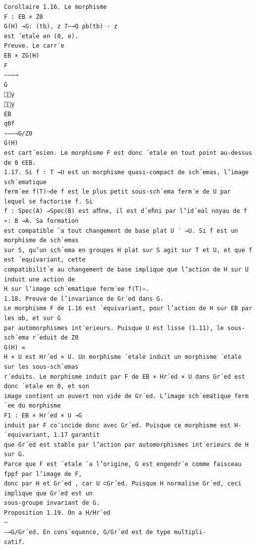 \documentclass[10pt]{article}
\begin{document}
\begin{verbatim}
Corollaire 1.16. Le morphisme
F : EB × Z0
G(H) →G: (tb), z 7−→Q ρb(tb) · z
est ´etale en (0, e).
Preuve. Le carr´e
EB × ZG(H)
F
−−−→
G
y
y
EB
q0f
−−−→G/Z0
G(H)
est cart´esien. Le morphisme F est donc ´etale en tout point au-dessus de 0 ∈EB.
1.17. Si f : T →U est un morphisme quasi-compact de sch´emas, l’image sch´ematique
ferm´ee f(T)−de f est le plus petit sous-sch´ema ferm´e de U par lequel se factorise f. Si
f : Spec(A) →Spec(B) est aﬃne, il est d´eﬁni par l’id´eal noyau de f ∗: B →A. Sa formation
est compatible `a tout changement de base plat U ′ →U. Si f est un morphisme de sch´emas
sur S, qu’un sch´ema en groupes H plat sur S agit sur T et U, et que f est ´equivariant, cette
compatibilit´e au changement de base implique que l’action de H sur U induit une action de
H sur l’image sch´ematique ferm´ee f(T)−.
1.18. Preuve de l’invariance de Gr´ed dans G.
Le morphisme F de 1.16 est ´equivariant, pour l’action de H sur EB par les αb, et sur G
par automorphismes int´erieurs. Puisque U est lisse (1.11), le sous-sch´ema r´eduit de Z0
G(H) =
H × U est Hr´ed × U. Un morphisme ´etale induit un morphisme ´etale sur les sous-sch´emas
r´eduits. Le morphisme induit par F de EB × Hr´ed × U dans Gr´ed est donc ´etale en 0, et son
image contient un ouvert non vide de Gr´ed. L’image sch´ematique ferm´ee du morphisme
F1 : EB × Hr´ed × U →G
induit par F co¨ıncide donc avec Gr´ed. Puisque ce morphisme est H-´equivariant, 1.17 garantit
que Gr´ed est stable par l’action par automorphismes int´erieurs de H sur G.
Parce que F est ´etale `a l’origine, G est engendr´e comme faisceau fppf par l’image de F,
donc par H et Gr´ed , car U ⊂Gr´ed. Puisque H normalise Gr´ed, ceci implique que Gr´ed est un
sous-groupe invariant de G.
Proposition 1.19. On a H/Hr´ed
∼
−→G/Gr´ed. En cons´equence, G/Gr´ed est de type multipli-
catif.


\end{verbatim}
\end{document}
